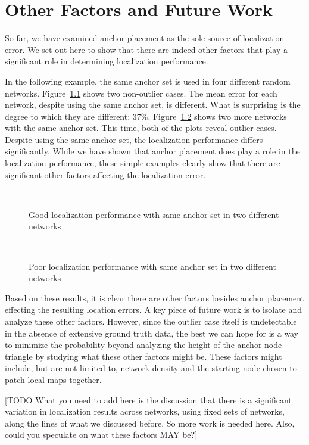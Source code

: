 \chapter{Other Factors and Future Work}
\label{sec:otherfactors}

So far, we have examined anchor placement as the sole source of localization error.  We set out here to show that there are indeed other factors that play a significant role in determining localization performance.

In the following example, the same anchor set is used in four different random networks.  Figure~\ref{fig:AS6good} shows two non-outlier cases.  The mean error for each network, despite using the same anchor set, is different.  What is surprising is the degree to which they are different: 37\%.  Figure~\ref{fig:AS6bad} shows two more networks with the same anchor set.  This time, both of the plots reveal outlier cases.  Despite using the same anchor set, the localization performance differs significantly.  While we have shown that anchor placement does play a role in the localization performance, these simple examples clearly show that there are significant other factors affecting the localization error.

\begin{figure}
  \centering
	\\
	\caption{Good localization performance with same anchor set in two different networks}
	\label{fig:AS6good}
\end{figure}

\begin{figure}
  \centering
\\
    \caption{Poor localization performance with same anchor set in two different networks}
	\label{fig:AS6bad}
\end{figure}

Based on these results, it is clear there are other factors besides anchor placement effecting the resulting location errors. A key piece of future work is to isolate and analyze these other factors.  However, since the outlier case itself is undetectable in the absence of extensive ground truth data, the best we can hope for is a way to minimize the probability beyond analyzing the height of the anchor node triangle by studying what these other factors might be.  These factors might include, but are not limited to, network density and the starting node chosen to patch local maps together.

[TODO  What you need to add here is the discussion that there is a significant variation in localization results across networks, using fixed sets of networks, along the lines of what we discussed before. So more work is needed here. Also, could you speculate on what these factors MAY be?]
